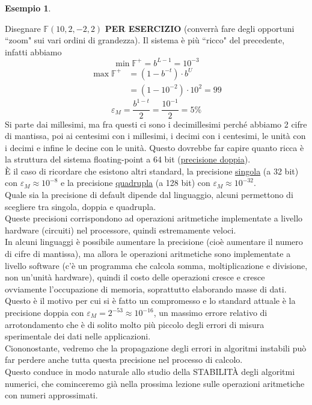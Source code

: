 \documentclass[12pt]{article}
\newtheorem*{esempio}{Esempio}
\begin{document}
\begin{esempio} \end{esempio}
Disegnare $\mathbb{F}(10, 2, -2, 2)$ \textbf{PER ESERCIZIO} (converrà fare degli opportuni ``zoom" sui vari ordini di grandezza). Il sistema è più ``ricco" del precedente, infatti abbiamo
\[ \min \mathbb{F}^+ = b^{L-1} = 10^{-3} \]
\[\begin{split}
    \max \mathbb{F}^+ & = (1 - b^{-t}) \cdot b^U \\
    & = (1 - 10^{-2}) \cdot 10^2 = 99
\end{split}\]
\[ \varepsilon_M = \frac{b^{1-t}}{2} = \frac{10^{-1}}{2} = 5\% \]
Si parte dai millesimi, ma fra questi ci sono i decimillesimi perché abbiamo 2 cifre di mantissa, poi ai centesimi con i millesimi, i decimi con i centesimi, le unità con i decimi e infine le decine con le unità.
\newline \newline
Questo dovrebbe far capire quanto ricca è la struttura del sistema floating-point a 64 bit (\uline{precisione doppia}). \\
È il caso di ricordare che esistono altri standard, la precisione \uline{singola} (a 32 bit) con $\varepsilon_M \approx 10^{-8}$ e la precisione \uline{quadrupla} (a 128 bit) con $\varepsilon_M \approx 10^{-32}$.\\
Quale sia la precisione di default dipende dal linguaggio, alcuni permettono di scegliere tra singola, doppia e quadrupla. \\
Queste precisioni corrispondono ad operazioni aritmetiche implementate a livello hardware (circuiti) nel processore, quindi estremamente veloci. \\
In alcuni linguaggi è possibile aumentare la precisione (cioè aumentare il numero di cifre di mantissa), ma allora le operazioni aritmetiche sono implementate a livello software (c’è un programma che calcola somma, moltiplicazione e divisione, non un’unità hardware), quindi il costo delle operazioni cresce e cresce ovviamente l’occupazione di memoria, soprattutto elaborando masse di dati. \\
Questo è il motivo per cui si è fatto un compromesso e lo standard attuale è la precisione doppia con $\varepsilon_M = 2^{-53} \approx 10^{-16}$, un massimo errore relativo di arrotondamento che è di solito molto più piccolo degli errori di misura sperimentale dei dati nelle applicazioni.\\
Ciononostante, vedremo che la propagazione degli errori in algoritmi instabili può far perdere anche tutta questa precisione nel processo di calcolo. \\
Questo conduce in modo naturale allo studio della STABILITÀ degli algoritmi numerici, che cominceremo già nella prossima lezione sulle operazioni aritmetiche con numeri approssimati.
\end{document}
